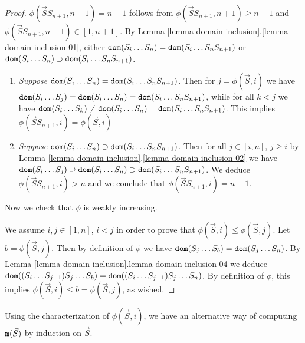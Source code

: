 \documentclass{lmcs}
\begin{document}
\begin{proof}
$\phi(\vec{S} S_{n+1}, n+1) = n+1$ follows from $\phi(\vec{S} S_{n+1}, n+1) \ge n+1$
and $\phi(\vec{S} S_{n+1}, n+1) \in [1,n+1]$. 
By Lemma \ref{lemma-domain-inclusion}.\ref{lemma-domain-inclusion-01}, 
either ${\tt dom}(S_i \ldots S_n) = {\tt dom}(S_i \ldots S_n S_{n+1})$ 
or ${\tt dom}(S_i \ldots S_n) \supset {\tt dom}(S_i \ldots S_n S_{n+1})$. 
\begin{enumerate}
\item
\emph{Suppose ${\tt dom}(S_i \ldots S_n) = {\tt dom}(S_i \ldots S_n S_{n+1})$}.
Then for $j = \phi(\vec{S},i)$
we have ${\tt dom}(S_i \ldots S_j) = {\tt dom}(S_i \ldots S_n) = {\tt dom}(S_i \ldots S_n S_{n+1})$,
while for all $k<j$ we have 
${\tt dom}(S_i \ldots S_k) \not = {\tt dom}(S_i \ldots S_n) = {\tt dom}(S_i \ldots S_n S_{n+1})$.
This implies $\phi(\vec{S}S_{n+1},i) = \phi(\vec{S},i)$

\item
\emph{Suppose ${\tt dom}(S_i \ldots S_n) \supset {\tt dom}(S_i \ldots S_n S_{n+1})$}.
Then for all $j \in [i,n]$, $j \ge i$ 
by Lemma \ref{lemma-domain-inclusion}.\ref{lemma-domain-inclusion-02} 
we have 
${\tt dom}(S_i \ldots S_j)  \supseteq {\tt dom}(S_i \ldots S_n) \supset {\tt dom}(S_i \ldots S_n S_{n+1})$.
We deduce $\phi(\vec{S}S_{n+1},i) >n$ 
and we conclude that $\phi(\vec{S}S_{n+1},i) = n+1$.

\end{enumerate}

Now we check that $\phi$ is weakly increasing.

We assume $i,j \in [1,n]$, $i < j$ in order to prove that $\phi(\vec{S},i) \le \phi(\vec{S},j)$.
Let $b =  \phi(\vec{S},j)$. Then by definition of $\phi$ we have 
${\tt dom}(S_j \ldots S_b) = {\tt dom}(S_j \ldots S_n)$. 
By Lemma \ref{lemma-domain-inclusion}.{lemma-domain-inclusion-04} we deduce
${\tt dom}((S_i \ldots S_{j-1}) S_j \ldots S_b) = {\tt dom}((S_i \ldots S_{j-1}) S_j \ldots S_n)$.
By definition of $\phi$, this implies $\phi(\vec{S},i) \le b =  \phi(\vec{S},j)$,
as wished.
\end{proof}

 Using the characterization of $\phi(\vec{S},i)$, we have an alternative
way of computing ${\tt m}(\vec{S})$ by induction on $\vec{S}$.
\end{document}
